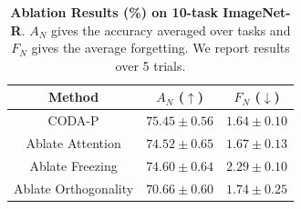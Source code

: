 \begin{table}[t]
\caption{\textbf{Ablation Results (\%) on 10-task ImageNet-R}. $A_N$ gives the accuracy averaged over tasks and $F_N$ gives the average forgetting. We report results over 5 trials.}

\centering
\label{tab:ablations}

\begin{tabular}{c||c|c} 
\hline
\rule{0pt}{10pt} Method & $A_N$ ($\uparrow$) & $F_N$ ($\downarrow$) \\
\hline
CODA-P               & $75.45 \pm 0.56$ & $1.64 \pm 0.10$   \\ 
\hline
Ablate Attention     & $74.52 \pm 0.65$ & $1.67 \pm 0.13$   \\  
Ablate Freezing      & $74.60 \pm 0.64$ & $2.29 \pm 0.10$   \\ 
Ablate Orthogonality & $70.66 \pm 0.60$ & $1.74 \pm 0.25$   \\ 

\hline
\end{tabular}
\end{table}
